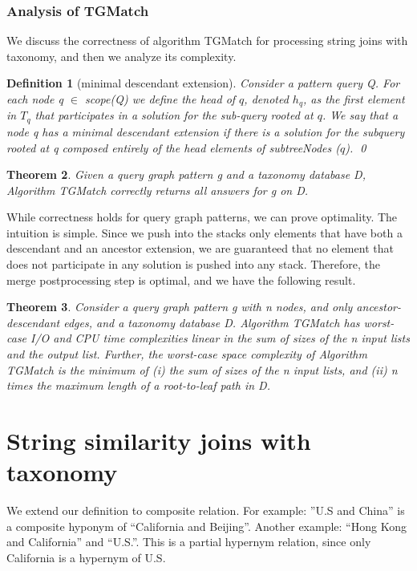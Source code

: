 \documentclass{sig-alternate}
\newtheorem{theorem}{Theorem}
\newtheorem{defi}[theorem]{Definition}
\newif\ifqedwritten
\newenvironment{definition}[1][]{\begin{defi}[#1]\upshape\qedwrittenfalse}{\qedhere\end{defi}}
\newcommand{\qedhere}{\ifqedwritten\else\ifmmode\tag*{\qed}\else\hfill\qed\fi\global\qedwrittentrue\fi}
\begin{document}
\subsubsection{Analysis of TGMatch}

 We discuss the correctness of algorithm TGMatch for processing string joins with taxonomy, and then we analyze its complexity.

 \begin{definition}[minimal descendant extension] Consider a pattern query Q. For each node
q $\in$ scope(Q) we define the head of $q$, denoted $h_q$,
as the first element in $T_q$ that participates in a solution for
the sub-query rooted at $q$. We say that a node q has a minimal
descendant extension if there is a solution for the subquery
rooted at q composed entirely of the head elements of
subtreeNodes ($q$).
\end{definition}

\smallskip

\begin{theorem}
 Given a query graph pattern g and a taxonomy
database D, Algorithm TGMatch correctly returns all answers
for g on D.
\end{theorem}

While correctness holds for query graph patterns, we can prove
optimality. The intuition is simple.
Since we push into the stacks only elements that have both
a descendant and an ancestor extension, we are guaranteed
that no element that does not participate in any solution is
pushed into any stack. Therefore, the merge postprocessing
step is optimal, and we have the following result.


\begin{theorem}
 Consider a query graph pattern g with n
nodes, and only ancestor-descendant edges, and a taxonomy
database D. Algorithm TGMatch has worst-case I/O and
CPU time complexities linear in the sum of sizes of the
n input lists and the output list. Further, the worst-case
space complexity of Algorithm  TGMatch is the minimum
of (i) the sum of sizes of the n input lists, and (ii) n times
the maximum length of a root-to-leaf path in D.
\end{theorem}

\section{String similarity joins with taxonomy}


We extend our definition to composite relation. For example: ''U.S and China'' is a composite hyponym of ``California and Beijing''. Another example: ``Hong Kong and California'' and ``U.S.''. This is a partial hypernym relation, since only California is a hypernym of U.S.
\end{document}
